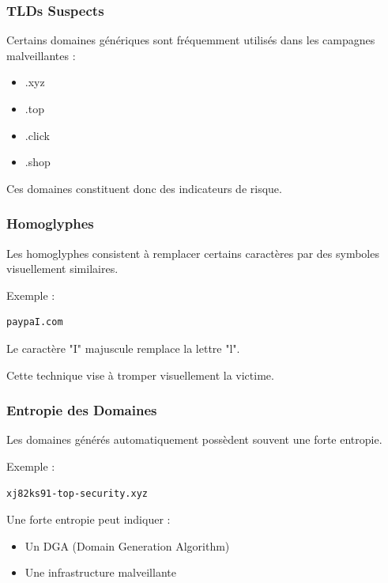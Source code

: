 \documentclass[12pt,a4paper]{article}
\begin{document}
\subsubsection{TLDs Suspects}

Certains domaines génériques sont fréquemment utilisés dans les campagnes malveillantes :
\begin{itemize}
    \item .xyz
    \item .top
    \item .click
    \item .shop
\end{itemize}

Ces domaines constituent donc des indicateurs de risque.

\subsubsection{Homoglyphes}

Les homoglyphes consistent à remplacer certains caractères par des symboles visuellement similaires.

Exemple :
\begin{verbatim}
paypaI.com
\end{verbatim}

Le caractère "I" majuscule remplace la lettre "l".

Cette technique vise à tromper visuellement la victime.

\subsubsection{Entropie des Domaines}

Les domaines générés automatiquement possèdent souvent une forte entropie.

Exemple :
\begin{verbatim}
xj82ks91-top-security.xyz
\end{verbatim}

Une forte entropie peut indiquer :
\begin{itemize}
    \item Un DGA (Domain Generation Algorithm)
    \item Une infrastructure malveillante
\end{itemize}
\end{document}
